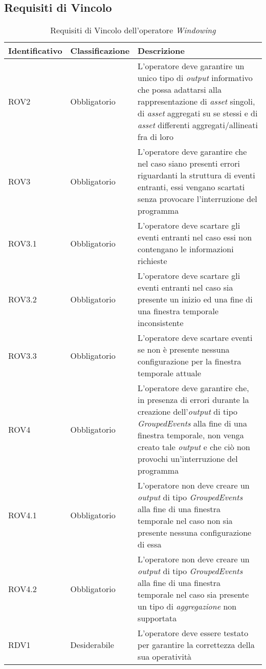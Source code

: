 \subsection{Requisiti di Vincolo}
{
\centering
\begin{longtable}{L{3cm} L{3cm} L{7.5cm}}
\caption{Requisiti di Vincolo dell'operatore \textit{Windowing}}\\
\textbf{Identificativo} &
\textbf{Classificazione}&
\textbf{Descrizione}\\
\endhead
\hline
ROV2 & Obbligatorio & L'operatore deve garantire un unico tipo di \textit{output} informativo che possa adattarsi alla rappresentazione di \textit{asset} singoli, di \textit{asset} aggregati su se stessi e di \textit{asset} differenti aggregati/allineati fra di loro \\
\hline
ROV3 & Obbligatorio & L'operatore deve garantire che nel caso siano presenti errori riguardanti la struttura di eventi entranti, essi vengano scartati senza provocare l'interruzione del programma\\
\hline
ROV3.1 & Obbligatorio & L'operatore deve scartare gli eventi entranti nel caso essi non contengano le informazioni richieste\\
\hline
ROV3.2 & Obbligatorio & L'operatore deve scartare gli eventi entranti nel caso sia presente un inizio ed una fine di una finestra temporale inconsistente\\
\hline
ROV3.3 & Obbligatorio & L'operatore deve scartare eventi se non è presente nessuna configurazione per la finestra temporale attuale\\
\hline
ROV4 & Obbligatorio & L'operatore deve garantire che, in presenza di errori durante la creazione dell'\textit{output} di tipo \textit{GroupedEvents} alla fine di una finestra temporale, non venga creato tale \textit{output} e che ciò non provochi un'interruzione del programma\\
\hline
ROV4.1 & Obbligatorio & L'operatore non deve creare un \textit{output} di tipo \textit{GroupedEvents} alla fine di una finestra temporale nel caso non sia presente nessuna configurazione di essa\\
\hline
ROV4.2 & Obbligatorio & L'operatore non deve creare un \textit{output} di tipo \textit{GroupedEvents} alla fine di una finestra temporale nel caso sia presente un tipo di \textit{aggregazione} non supportata\\
\hline
RDV1 & Desiderabile & L'operatore deve essere testato per garantire la correttezza della sua operatività\\
\hline
\end{longtable}
}



